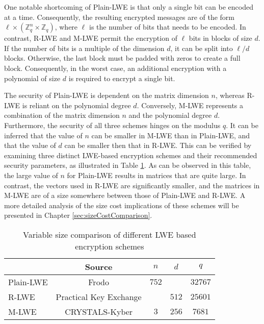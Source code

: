 One notable shortcoming of Plain-LWE is that only a single bit can be encoded at a time. Consequently, the resulting encrypted messages are of the form $\ell \times (\mathbb{Z}_q^{n}\times\mathbb{Z}_q)$, where $\ell$ is the number of bits that needs to be encoded. In contrast, R-LWE and M-LWE permit the encryption of $\ell$ bits in blocks of size $d$. If the number of bits is a multiple of the dimension $d$, it can be split into $\ell / d$ blocks. Otherwise, the last block must be padded with zeros to create a full block. Consequently, in the worst case, an additional encryption with a polynomial of size $d$ is required to encrypt a single bit.

The security of Plain-LWE is dependent on the matrix dimension $n$, whereas R-LWE is reliant on the polynomial degree $d$. Conversely, M-LWE represents a combination of the matrix dimension $n$ and the polynomial degree $d$.  
Furthermore, the security of all three schemes hinges on the modulus $q$. It can be inferred that the value of $n$ can be smaller in M-LWE than in Plain-LWE, and that the value of $d$ can be smaller then that in R-LWE. This can be verified by examining three distinct LWE-based encryption schemes and their recommended security parameters, as illustrated in Table \ref{table:LweParameterComparison}. As can be observed in this table, the large value of $n$ for Plain-LWE results in matrices that are quite large. In contrast, the vectors used in R-LWE are significantly smaller, and the matrices in M-LWE are of a size somewhere between those of Plain-LWE and R-LWE. A more detailed analysis of the size cost implications of these schemes will be presented in Chapter \ref{sec:sizeCostComparison}.

\begin{table}[htp]
  \centering
  \caption{Variable size comparison of different LWE based encryption schemes}
  \begin{tabular}{|l|c|c|c|c|}
    \toprule
              & Source                                             & $n$   & $d$   & $q$     \\
    
    \midrule
    Plain-LWE & Frodo \cite{frodo}                                 & $752$ &       & $32767$ \\
    R-LWE     & Practical Key Exchange \cite{PracticalKeyExchange} &       & $512$ & $25601$ \\
    M-LWE     & CRYSTALS-Kyber \cite{CyrstalsKyber}                & $3$   & $256$ & $7681$  \\   
    \bottomrule
  \end{tabular}
  \label{table:LweParameterComparison}
\end{table}

